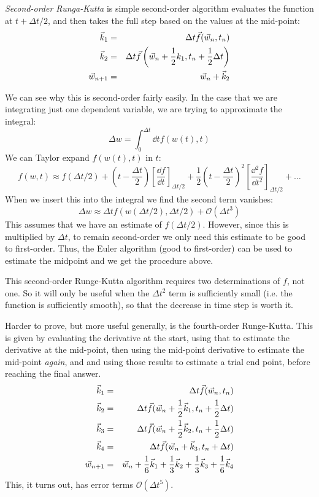 {\it Second-order Runga-Kutta} is simple second-order algorithm
evaluates the function at $t+\Delta t /2$, and then takes the full
step based on the values at the mid-point:
\begin{eqnarray}
\vec{k}_1 &=& \Delta t \vec{f}(\vec{w}_n, t_n) \cr
\vec{k}_2 &=& \Delta t \vec{f}\left(\vec{w}_n + \frac{1}{2} k_1,
t_n + \frac{1}{2}\Delta t\right) \cr
\vec{w}_{n+1} &=& \vec{w}_n + \vec{k}_2
\end{eqnarray}

We can see why this is second-order fairly easily. In the case that we
are integrating just one dependent variable, we are trying to
approximate the integral:
\begin{equation}
\Delta w = \int_0^{\Delta t} \dd{t} f(w(t), t)
\end{equation}
We can Taylor expand $f(w(t), t)$ in $t$:
\begin{equation}
  f(w, t) \approx f\left(\Delta t /2\right) +
  \left(t - \frac{\Delta t}{2}\right) \left[\frac{\dd{f}}{\dd{t}}\right]_{\Delta t /2} + 
  \frac{1}{2} \left(t - \frac{\Delta t}{2}\right)^2
  \left[\frac{\dd{^2f}}{\dd{t}^2}\right]_{\Delta t /2}   + \ldots
\end{equation}
When we insert this into the integral we find the second term vanishes:
\begin{equation}
\Delta w \approx \Delta t f(w(\Delta t /2), \Delta t /2) +
\mathcal{O}(\Delta t^3)
\end{equation}
This assumes that we have an estimate of $f(\Delta t /2)$.  However,
since this is multiplied by $\Delta t$, to remain second-order we only
need this estimate to be good to first-order. Thus, the Euler
algorithm (good to first-order) can be used to estimate the midpoint
and we get the procedure above.

This second-order Runge-Kutta algorithm requires two determinations of
$f$, not one. So it will only be useful when the $\Delta t^2$ term is
sufficiently small (i.e. the function is sufficiently smooth), so that
the decrease in time step is worth it.  

Harder to prove, but more useful generally, is the fourth-order
Runge-Kutta. This is given by evaluating the derivative at the start,
using that to estimate the derivative at the mid-point, then using the
mid-point derivative to estimate the mid-point {\it again}, and and
using those results to estimate a trial end point, before reaching the
final answer.
\begin{eqnarray}
\vec{k}_1 &=& \Delta t \vec{f}(\vec{w}_n, t_n) \cr
\vec{k}_2 &=& \Delta t \vec{f}(\vec{w}_n + \frac{1}{2} \vec{k}_1, t_n +
\frac{1}{2} \Delta t) \cr
\vec{k}_3 &=& \Delta t \vec{f}(\vec{w}_n + \frac{1}{2} \vec{k}_2, t_n +
\frac{1}{2} \Delta t) \cr
\vec{k}_4 &=& \Delta t \vec{f}(\vec{w}_n + \vec{k}_3, t_n + \Delta t) \cr
\vec{w}_{n+1}  &=& \vec{w}_n + \frac{1}{6} \vec{k}_1
+ \frac{1}{3} \vec{k}_2 + \frac{1}{3} \vec{k}_3 + \frac{1}{6} \vec{k}_4
\end{eqnarray}
This, it turns out, has error terms $\mathcal{O}(\Delta t^5)$. 

